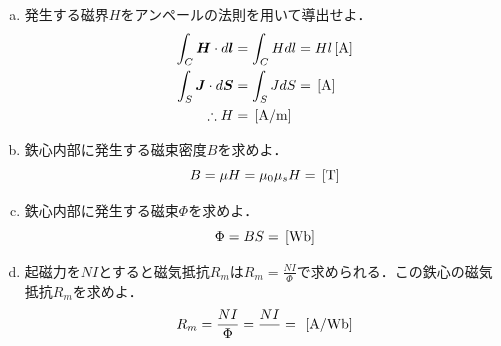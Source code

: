 \documentclass[dvipdfmx]{ujarticle}
\begin{document}
\begin{enumerate}[(a)]
	\item 発生する磁界$H$をアンペールの法則を用いて導出せよ．
	\begin{align*}
	\int_{C}\boldsymbol{H}\cdot d\boldsymbol{l}&=\int_{C}Hdl=Hl\,[\rm{A}]\\
	\int_{S}\boldsymbol{J}\cdot d\boldsymbol{S}&=\int_{S}JdS=\,[\rm{A}]\\
	\therefore H&=\,[\rm{A/m}]
	\end{align*}
	\item 鉄心内部に発生する磁束密度$B$を求めよ．
	\begin{equation*}
	B=\mu H=\mu_{0}\mu_{s}H=\,[\rm{T}]
	\end{equation*}
	\item 鉄心内部に発生する磁束$\Phi$を求めよ．
	\begin{equation*}
	\Phi=BS=\,[\rm{Wb}]
	\end{equation*}
	\item 起磁力を$NI$とすると磁気抵抗$R_{m}$は$R_{m}=\frac{NI}{\Phi}$で求められる．この鉄心の磁気抵抗$R_{m}$を求めよ．
	\begin{equation*}
	R_{m}=\frac{NI}{\Phi}=\frac{NI}{}=\frac{}{}\,[\rm{A/Wb}]
	\end{equation*}
\end{enumerate}
\end{document}
